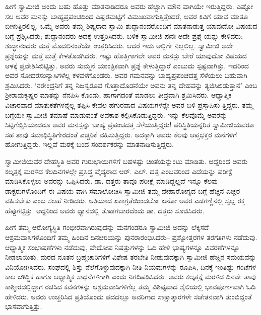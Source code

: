 ಹೀಗೆ ಸ್ವಾಮೀಜಿ ಅಂದು ಬಹು ಹೊತ್ತು ಮಾತನಾಡಿದರೂ ಅವರು ಹೆಚ್ಚಾಗಿ ಮೌನ ವಾಗಿಯೇ ಇರುತ್ತಿದ್ದರು. ಎಷ್ಟೋ ಸಲ ಅವರ ಮನಸ್ಸು ಬಾಹ್ಯಪ್ರಪಂಚದಿಂದ ಎಷ್ಟರಮಟ್ಟಿಗೆ ವಿಮುಖವಾಗುತ್ತಿತ್ತೆಂದರೆ, ಅವರ ಕಿವಿಗೆ ಯಾವ ಮಾತೂ ಬೀಳುತ್ತಿರಲಿಲ್ಲ. ಒಮ್ಮೆ ಅವರು ತಮ್ಮ ಶಿಷ್ಯರಾದ ಸ್ವಾಮಿ ಶುದ್ಧಾನಂದರೊಂದಿಗೆ ಮಾತನಾಡುತ್ತ ಯಾವುದೋ ವಿಷಯದ ಬಗ್ಗೆ ಪ್ರಶ್ನಿಸಿದರು; ಶುದ್ಧಾನಂದರು ಅದಕ್ಕೆ ಉತ್ತರಿಸಿದರು. ಬಳಿಕ ಸ್ವಾಮೀಜಿ ಪುನಃ ಅದೇ ಪ್ರಶ್ನೆ ಯನ್ನು ಕೇಳಿದರು; ಶುದ್ಧಾನಂದರು ಮತ್ತೆ ಮೊದಲಿನಂತೆಯೇ ಉತ್ತರಿಸಿದರು. ಆದರೆ ಇದು ಅಲ್ಲಿಗೇ ನಿಲ್ಲಲಿಲ್ಲ. ಸ್ವಾಮೀಜಿ ಅದೇ ಪ್ರಶ್ನೆಯನ್ನು ಮತ್ತೆ ಮತ್ತೆ ಕೇಳತೊಡಗಿದರು. ಇಷ್ಟು ಹೊತ್ತಿಗಾಗಲೇ ಅವರ ಮನಸ್ಸು ಬೇರೆ ಯಾವುದೋ ವಿಷಯದ ಆಳಕ್ಕೆ ಪ್ರವೇಶಿಸಿಬಿಟ್ಟಿತ್ತು. ಅವರು ಸುಮ್ಮನೆ ಯಾಂತ್ರಿಕವಾಗಿ ಪ್ರಶ್ನೆ ಕೇಳುತ್ತಿದ್ದಾರೆ ಎಂಬುದು ಸ್ಪಷ್ಟವಾಗಿತ್ತು. ಇದರಿಂದ ಅವರ ಸೋದರಸಂನ್ಯಾಸಿಗಳೆಲ್ಲ ಕಳವಳಗೊಂಡರು. ಅವರ ಗಮನವನ್ನು ಬಾಹ್ಯಪ್ರಪಂಚದತ್ತ ಸೆಳೆಯಲು ಬಹುವಾಗಿ ಶ್ರಮಿಸಿದರು. ‘ನರೇಂದ್ರನಿಗೆ ತನ್ನ ನಿಜಸ್ವರೂಪ ಗೊತ್ತಾದೊಡನೆಯೇ ಅವನು ತನ್ನ ದೇಹವನ್ನು ತ್ಯಜಿಸಿಬಿಡುತ್ತಾನೆ’ ಎಂಬ ಶ್ರೀರಾಮಕೃಷ್ಣರ ಮಾತನ್ನು ನೆನಪಿಸಿ ಕೊಂಡು, ಹಾಗಾಗದಂತೆ ಮಾಡಲು ತೀವ್ರವಾಗಿ ಶ್ರಮಿಸಿದರು. ಆಧ್ಯಾತ್ಮಿಕ ವಿಚಾರವಾದ ಮಾತುಕತೆಗಳನ್ನೆಲ್ಲ ತಪ್ಪಿಸಿ ಕೇವಲ ಹಗುರವಾದ ವಿಷಯಗಳನ್ನೇ ಅವರ ಬಳಿ ಪ್ರಸ್ತಾಪಿಸು ತ್ತಿದ್ದರು. ತಮ್ಮ ಬಗ್ಗೆಯೇ ಸ್ವಾಮೀಜಿ ತಮಾಷೆ ಮಾಡುವಂತೆ ಅವಕಾಶ ಕಲ್ಪಿಸಿಕೊಡುತ್ತಿದ್ದರು. ಇನ್ನು ಕೆಲವೊಮ್ಮೆ ಅವರನ್ನು ಸಿಟ್ಟಿಗೆಬ್ಬಿಸಿಯಾದರೂ ಅವರ ಮನಸ್ಸನ್ನು ಬಾಹ್ಯ ಪ್ರಪಂಚದತ್ತ ಸೆಳೆಯುತ್ತಿದ್ದರು! ಪರಿಸ್ಥಿತಿಯನ್ನರಿತ ಸ್ವಾಮೀಜಿಯವರೂ ಸಹ ತಾವು ಸಮಾಧಿಸ್ಥಿತಿಗೇರದಂತೆ ಎಚ್ಚರಿಕೆ ವಹಿಸುತ್ತಿದ್ದರು. ಅದಕ್ಕಾಗಿ ಅವರು ಕೆಲವು ಆಪ್ತಭಕ್ತರ ಮನೆಗಳಿಗೆ ಹೋಗುತ್ತಿದ್ದರು. ಇಲ್ಲವೆ ಮಠಕ್ಕೆ ಬಂದ ಸಂದರ್ಶಕರನ್ನು ಮಾತನಾಡಿಸುತ್ತಿದ್ದರು.

ಸ್ವಾಮೀಜಿಯವರ ದೇಹಸ್ಥಿತಿ ಅವರ ಗುರುಭಾಯಿಗಳಿಗೆ ಬಹಳಷ್ಟು ಚಿಂತೆಯನ್ನುಂಟು ಮಾಡಿತು. ಆದ್ದರಿಂದ ಅವರು ಕಲ್ಕತ್ತಕ್ಕೆ ಮರಳಿದ ಕೆಲದಿನಗಳಲ್ಲೇ ಪ್ರಸಿದ್ಧ ವೈದ್ಯರಾದ ಆರ್. ಎಲ್. ದತ್ತ ಎಂಬವರಿಂದ ಎದೆಯನ್ನು ಪರೀಕ್ಷೆ ಮಾಡಿಸಿಕೊಳ್ಳಲು ಅವರನ್ನು ಒಪ್ಪಿಸಿದರು. ಡಾ. ದತ್ತರು ತಾವೂ ಪರೀಕ್ಷೆ ಮಾಡಿದ್ದಲ್ಲದೆ ಇನ್ನೂ ಕೆಲವು ಡಾಕ್ಟರುಗಳೊಂದಿಗೆ ಈ ವಿಷಯ ವಾಗಿ ಸಮಾಲೋಚಿಸಿ ಸ್ವಾಮೀಜಿ ತಮ್ಮ ದೇಹಾರೋಗ್ಯದ ಬಗ್ಗೆ ಹೆಚ್ಚಿನ ಎಚ್ಚರ ವಹಿಸಬೇಕು ಎಂಬ ಸಲಹೆ ನೀಡಿದರು. ಅತಿಯಾದ ಏಕಾಗ್ರತೆಯಿಂದಲೋ ಏನೋ ಅವರ ಎಡಗಣ್ಣಿನಲ್ಲಿ ಸ್ವಲ್ಪ ರಕ್ತ ಹೆಪ್ಪುಗಟ್ಟಿತ್ತು. ಆದ್ದರಿಂದ ಅವರು ಧ್ಯಾನದಲ್ಲಿ ತೊಡಗಬಾರದೆಂದು ಡಾ. ದತ್ತರು ಸೂಚಿಸಿದರು.

ಹೀಗೆ ತಮ್ಮ ಆರೋಗ್ಯಸ್ಥಿತಿ ಗಂಭೀರವಾಗಿರುವುದನ್ನು ಮನಗಂಡರೂ ಸ್ವಾಮೀಜಿ ಅದನ್ನು ಲೆಕ್ಕಿಸದೆ ಆಶ್ರಮವಾಸಿಗಳೊಂದಿಗೆ ತಮ್ಮ ಹಿಂದಿನ ದಿನಚರಿಯನ್ನು ಪುನರಾರಂಭಿಸಿದರು– ಪ್ರಶ್ನೋತ್ತರಗಳ ತರಗತಿಗಳು ನಡೆದುವು. ಆಧ್ಯಾತ್ಮಿಕ ಸಂಭಾಷಣೆಗಳು ನಡೆದುವು, ವೇದೋಪ ನಿಷತ್ತುಗಳನ್ನು ಓದಿ ಹೇಳಿ ಭಾಷ್ಯಗಳನ್ನೂ ವಿವರಣೆಗಳನ್ನೂ ನೀಡಲಾಯಿತು. ಮಠದ ನೂತನ ಬ್ರಹ್ಮಚಾರಿಗಳಿಗೆ ವಿಶೇಷ ತರಬೇತಿ ನೀಡುವುದಕ್ಕಾಗಿ ಸ್ವಾಮೀಜಿ ಹೆಚ್ಚಿನ ಸಮಯವನ್ನು ವಿನಿಯೋಗಿಸಿದರು. ಸಂಘದಲ್ಲಿ ಶಿಸ್ತು ನೆಲೆಗೊಳ್ಳುವುದಕ್ಕಾಗಿ ನೀತಿ ನಿಯಮಗಳನ್ನು ರೂಪಿಸಿ, ದಿನಕ್ಕೆ ಇಂತಿಷ್ಟು ಗಂಟೆಗಳ ಕಾಲ ಬೌದ್ಧಿಕ ಹಾಗೂ ಆಧ್ಯಾತ್ಮಿಕ ಸಾಧನೆಗಳಿಗಾಗಿ ಎಂದು ನಿಗದಿಪಡಿಸಿದರು. ಅವರು ಕಲ್ಕತ್ತಕ್ಕೆ ಮರಳಿದ ದಿನವೇ ತಾವು ಕಾಶ್ಮೀರದಲ್ಲಿದ್ದಾಗ ರಚಿಸಿದ ಕವನಗಳನ್ನು ಆಶ್ರಮವಾಸಿಗಳಿಗೆಲ್ಲ ತಮ್ಮ ವಿಶಿಷ್ಟವಾದ ಶೈಲಿಯಲ್ಲಿ ಭಾವಪೂರ್ಣವಾಗಿ ಓದಿ ಹೇಳಿದರು. ಅವರು ಉಚ್ಚರಿಸಿದ ಪ್ರತಿಯೊಂದು ಪದದಲ್ಲೂ ಅವರಿಗಾದ ಸಾಕ್ಷಾತ್ಕಾರಗಳೇ ಸಚೇತನವಾಗಿ ತುಂಬಿದ್ದಂತೆ ಭಾಸವಾಗುತ್ತಿತ್ತು.

